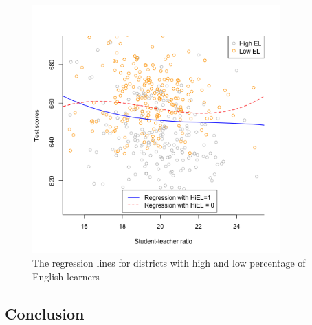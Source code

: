 \documentclass[11pt]{article}
\begin{document}
\begin{figure}[htbp]
\centering
\includegraphics[width=0.85\textwidth]{./img/fig-8-11.png}
\caption{\label{fig:org97997ac}
The regression lines for districts with high and low percentage of English learners}
\end{figure}

\subsection*{Conclusion}
\label{sec:orgd12ec1e}
\end{document}
